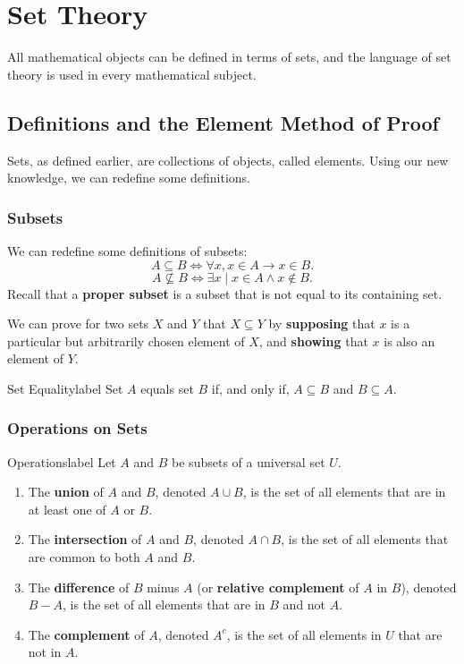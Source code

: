 \documentclass[a4paper]{report}
\begin{document}
\chapter{Set Theory}

All mathematical objects can be defined in terms of sets, and the language of set theory is used
in every mathematical subject.

\section{Definitions and the Element Method of Proof}

Sets, as defined earlier, are collections of objects, called elements. Using our new knowledge, we can
redefine some definitions.

\subsection{Subsets}

We can redefine some definitions of subsets: \[
A \subseteq B \Leftrightarrow \forall x, x \in A \to x \in B
.\] 
\[
A \not\subseteq B \Leftrightarrow \exists x  \mid x \in A \land x \not\in B
.\] 
Recall that a \textbf{proper subset} is a subset that is not equal to its containing set.

We can prove for two sets $X$ and $Y$ that $X \subseteq Y$ by \textbf{supposing} that $x$ is a particular but
arbitrarily chosen element of $X$, and \textbf{showing} that $x$ is also an element of $Y$.

\begin{definition}{Set Equality}{label}
    Set $A$ equals set $B$ if, and only if, $A \subseteq B$ and $B \subseteq A$.
\end{definition}

\subsection{Operations on Sets}

\begin{definition}{Operations}{label}
    Let $A$ and $B$ be subsets of a universal set $U$.
    \begin{enumerate}
        \item The \textbf{union} of $A$ and $B$, denoted $A \cup B$, is the set of all elements
            that are in at least one of $A$ or $B$.
        \item The \textbf{intersection} of $A$ and $B$, denoted $A \cap B$, is the set
            of all elements that are common to both $A$ and $B$.
        \item The \textbf{difference} of $B$ minus $A$ (or \textbf{relative complement}
            of $A$ in $B$), denoted $B - A$, is the set of all elements that are in
            $B$ and not $A$.
        \item The \textbf{complement} of $A$, denoted $A^c$, is the set of all elements
            in $U$ that are not in $A$.
    \end{enumerate}
\end{definition}
\end{document}
